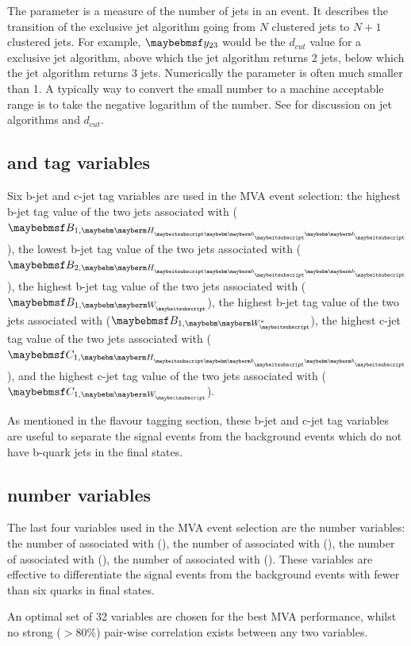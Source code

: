 The \y{} parameter is a measure of the number of jets in an event.  It describes the transition of  the exclusive jet algorithm going from $N$ clustered jets to $N\!+\!1$ clustered jets. For example, $\y{23}$ would be the $d_{cut}$ value for a exclusive jet algorithm, above which the jet algorithm returns 2 jets, below which the jet algorithm returns 3 jets. Numerically the \y{} parameter is often much smaller than 1. A typically way to convert the small number to a machine acceptable range is to take the negative logarithm of the number. See  for discussion on jet algorithms and $d_{cut}$.

\subsection{\Pbottom and \Pcharm tag  variables}

Six b-jet and c-jet tag variables are used in the MVA event selection: the highest b-jet tag value of the two jets associated with \Hbb ($\btagFull{1,\Hbb}$), the lowest b-jet tag value of the two jets associated with \Hbb ($\btagFull{2,\Hbb}$), the highest b-jet tag value of the two jets associated with \PW ($\btagFull{1,\PW}$), the highest b-jet tag value of the two jets associated with \W* ($\btagFull{1,\W*}$), the highest c-jet tag value of the two jets associated with \Hbb ($\ctagFull{1,\Hbb}$), and the highest c-jet tag value of the two jets associated with \PW ($\ctagFull{1,\PW}$).

As mentioned in the flavour tagging section, these b-jet and c-jet tag variables are useful to separate the signal events from the background events which do not have b-quark jets in the final states.

\subsection{\PFOs number  variables}

The last four variables used in the MVA event selection are the \PFOs number  variables: the number of \PFOs associated with \Hbb (\Hbb), the number of \PFOs associated with \HWW (\HWW), the number of \PFOs associated with \PW (\PW), the number of \PFOs associated with \W* (\W*). These variables are effective to differentiate the signal events from the background events with fewer than six quarks in final states.

An optimal set of 32 variables are chosen for the best MVA performance, whilst no strong ($>80\%$) pair-wise correlation exists between any two variables. %

